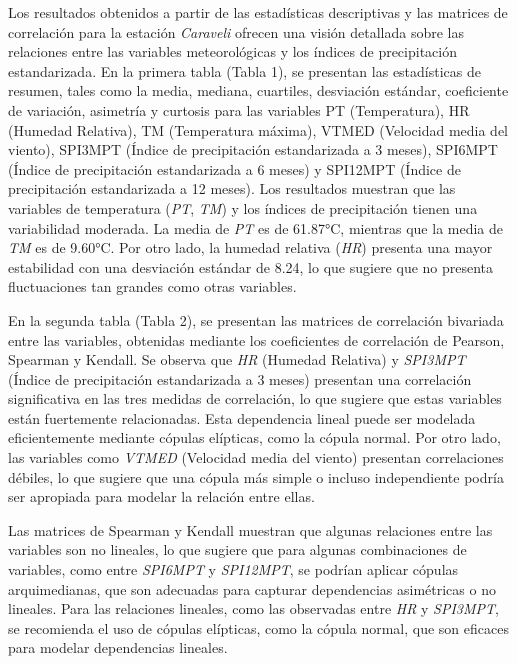 \begin{figure}[htbp]
\end{figure}



Los resultados obtenidos a partir de las estadísticas descriptivas y las matrices de correlación para la estación \textit{Caraveli} ofrecen una visión detallada sobre las relaciones entre las variables meteorológicas y los índices de precipitación estandarizada. En la primera tabla (Tabla 1), se presentan las estadísticas de resumen, tales como la media, mediana, cuartiles, desviación estándar, coeficiente de variación, asimetría y curtosis para las variables PT (Temperatura), HR (Humedad Relativa), TM (Temperatura máxima), VTMED (Velocidad media del viento), SPI3MPT (Índice de precipitación estandarizada a 3 meses), SPI6MPT (Índice de precipitación estandarizada a 6 meses) y SPI12MPT (Índice de precipitación estandarizada a 12 meses). Los resultados muestran que las variables de temperatura (\textit{PT}, \textit{TM}) y los índices de precipitación tienen una variabilidad moderada. La media de \textit{PT} es de 61.87°C, mientras que la media de \textit{TM} es de 9.60°C. Por otro lado, la humedad relativa (\textit{HR}) presenta una mayor estabilidad con una desviación estándar de 8.24, lo que sugiere que no presenta fluctuaciones tan grandes como otras variables.

En la segunda tabla (Tabla 2), se presentan las matrices de correlación bivariada entre las variables, obtenidas mediante los coeficientes de correlación de Pearson, Spearman y Kendall. Se observa que \textit{HR} (Humedad Relativa) y \textit{SPI3MPT} (Índice de precipitación estandarizada a 3 meses) presentan una correlación significativa en las tres medidas de correlación, lo que sugiere que estas variables están fuertemente relacionadas. Esta dependencia lineal puede ser modelada eficientemente mediante cópulas elípticas, como la cópula normal. Por otro lado, las variables como \textit{VTMED} (Velocidad media del viento) presentan correlaciones débiles, lo que sugiere que una cópula más simple o incluso independiente podría ser apropiada para modelar la relación entre ellas.

Las matrices de Spearman y Kendall muestran que algunas relaciones entre las variables son no lineales, lo que sugiere que para algunas combinaciones de variables, como entre \textit{SPI6MPT} y \textit{SPI12MPT}, se podrían aplicar cópulas arquimedianas, que son adecuadas para capturar dependencias asimétricas o no lineales. Para las relaciones lineales, como las observadas entre \textit{HR} y \textit{SPI3MPT}, se recomienda el uso de cópulas elípticas, como la cópula normal, que son eficaces para modelar dependencias lineales.

